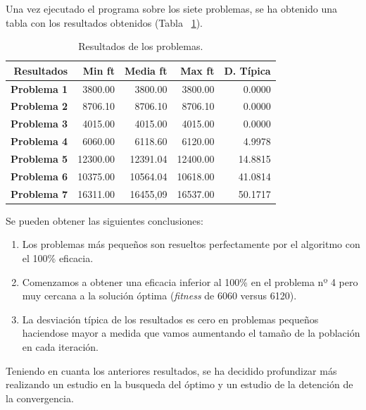 \documentclass[runningheads]{llncs}
\begin{document}
\noindent
Una vez ejecutado el programa sobre los siete problemas, se ha obtenido una tabla con los resultados obtenidos (Tabla ~\ref{tab:results}).
\begin{table}
	\centering
	\begin{tabular}{rrrrr}
		\hline
		\textbf{Resultados} & \textbf{Min ft} & \textbf{Media ft} & \textbf{Max ft} & \textbf{D. Típica} \\
		\hline
		\textbf{Problema 1} & 3800.00         & 3800.00           & 3800.00         & 0.0000             \\
		\hline
		\textbf{Problema 2} & 8706.10         & 8706.10           & 8706.10         & 0.0000             \\
		\hline
		\textbf{Problema 3} & 4015.00         & 4015.00           & 4015.00         & 0.0000             \\
		\hline
		\textbf{Problema 4} & 6060.00         & 6118.60           & 6120.00         & 4.9978             \\
		\hline
		\textbf{Problema 5} & 12300.00        & 12391.04          & 12400.00        & 14.8815            \\
		\hline
		\textbf{Problema 6} & 10375.00        & 10564.04          & 10618.00        & 41.0814            \\
		\hline
		\textbf{Problema 7} & 16311.00        & 16455,09          & 16537.00        & 50.1717            \\
	\end{tabular}

	\caption{Resultados de los problemas.}
	\label{tab:results}
\end{table}

Se pueden obtener las siguientes conclusiones:
\begin{enumerate}
	\item Los problemas más pequeños son resueltos perfectamente por el algoritmo con el 100\% eficacia.
	\item Comenzamos a obtener una eficacia inferior al 100\% en el problema nº 4 pero muy cercana a la solución óptima (\textit{fitness} de 6060 versus 6120).
	\item La desviación típica de los resultados es cero en problemas pequeños haciendose mayor a medida que vamos aumentando el tamaño de la población en cada iteración.
\end{enumerate}

\noindent
Teniendo en cuanta los anteriores resultados, se ha decidido profundizar más realizando un estudio en la busqueda del óptimo y un estudio de la detención de la convergencia.
\end{document}
